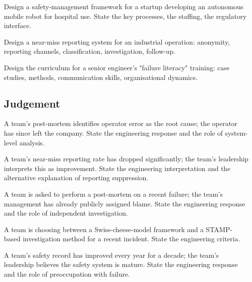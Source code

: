 \begin{exercise}
Design a safety-management framework for a startup developing an autonomous mobile robot for hospital use. State the key processes, the staffing, the regulatory interface.
\end{exercise}

\begin{exercise}
Design a near-miss reporting system for an industrial operation: anonymity, reporting channels, classification, investigation, follow-up.
\end{exercise}

\begin{exercise}
Design the curriculum for a senior engineer's "failure literacy" training: case studies, methods, communication skills, organisational dynamics.
\end{exercise}

\subsection*{Judgement}

\begin{exercise}
A team's post-mortem identifies operator error as the root cause; the operator has since left the company. State the engineering response and the role of system-level analysis.
\end{exercise}

\begin{exercise}
A team's near-miss reporting rate has dropped significantly; the team's leadership interprets this as improvement. State the engineering interpretation and the alternative explanation of reporting suppression.
\end{exercise}

\begin{exercise}
A team is asked to perform a post-mortem on a recent failure; the team's management has already publicly assigned blame. State the engineering response and the role of independent investigation.
\end{exercise}

\begin{exercise}
A team is choosing between a Swiss-cheese-model framework and a STAMP-based investigation method for a recent incident. State the engineering criteria.
\end{exercise}

\begin{exercise}
A team's safety record has improved every year for a decade; the team's leadership believes the safety system is mature. State the engineering response and the role of preoccupation with failure.
\end{exercise}

